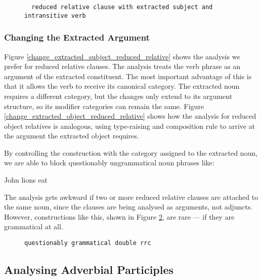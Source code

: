 \begin{figure}
 \begin{verbatim}
  reduced relative clause with extracted subject and intransitive verb
 \end{verbatim}
\label{change_object_reduced_subject_relative}
\end{figure}


\subsubsection{Changing the Extracted Argument}

Figure \ref{change_extracted_subject_reduced_relative} shows the analysis we prefer for reduced relative clauses. The analysis treats the verb phrase as an argument of the extracted constituent. The most important advantage of this is that it allows the verb to receive its canonical category. The extracted noun requires a different category, but the changes only extend to its argument structure, so its modifier categories can remain the same. Figure \ref{change_extracted_object_reduced_relative} shows how the analysis for reduced object relatives is analogous, using type-raising and composition rule to arrive at the  argument the extracted object requires.

By controlling the construction with the category assigned to the extracted noun, we are able to block questionably ungrammatical noun phrases like:

\begin{lexamples}
\item * John lions eat
\end{lexamples}

The analysis gets awkward if two or more reduced relative clauses are attached to the same noun, since the clauses are being analysed as arguments, not adjuncts. However, constructions like this, shown in Figure \ref{double_rrc}, are rare --- if they are grammatical at all.

\begin{figure}
 \begin{verbatim}
questionably grammatical double rrc
 \end{verbatim}
\label{double_rrc}
\end{figure}


\subsection{Analysing Adverbial Participles}

